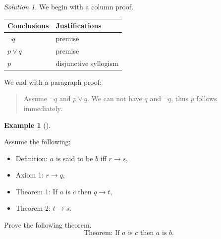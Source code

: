 \documentclass[
  letterpaper,
  10pt,
  reqno,
  twopage,
  openany]{book}
\providecommand{\tightlist}{%
  \setlength{\itemsep}{0pt}\setlength{\parskip}{0pt}}\usepackage{longtable,booktabs,array}
\theoremstyle{plain}
\theoremstyle{definition}
\theoremstyle{definition}
\theoremstyle{definition}
\newtheorem{example}{Example}[chapter]
\theoremstyle{plain}
\theoremstyle{plain}
\theoremstyle{remark}
\newtheorem*{solution}{Solution}
\begin{document}
\begin{solution}

We begin with a column proof.

\begin{longtable}[]{@{}ll@{}}
\toprule()
Conclusions & Justifications \\
\midrule()
\endhead
\(\neg q\) & premise \\
\(p\lor q\) & premise \\
\(p\) & disjunctive syllogism \\
\bottomrule()
\end{longtable}

We end with a paragraph proof:

\begin{quote}
Assume \(\neg q\) and \(p\lor q\). We can not have \(q\) and \(\neg q\),
thus \(p\) follows immediately.
\end{quote}

\end{solution}

\leavevmode{}%
\begin{example}[]\label{exm-proof-example-2}

Assume the following:

\begin{itemize}
\tightlist
\item
  Definition: \(a\) is said to be \(b\) iff \(r\rightarrow s\),
\item
  Axiom 1: \(r\rightarrow q\),
\item
  Theorem 1: If \(a\) is \(c\) then \(q\rightarrow t\),
\item
  Theorem 2: \(t\rightarrow s\).
\end{itemize}

Prove the following theorem. \[
\text{Theorem: If $a$ is $c$ then $a$ is $b.$}
\]

\end{example}
\end{document}
